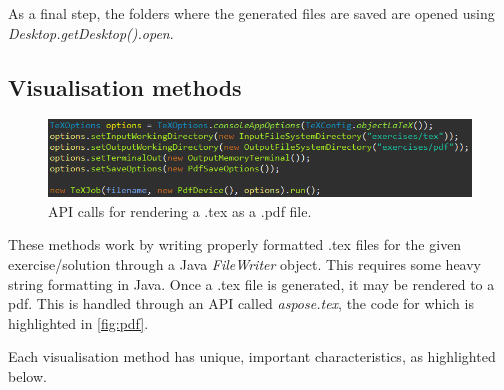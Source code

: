 \documentclass{l4proj}
\begin{document}
As a final step, the folders where the generated files are saved are opened using \emph{Desktop.getDesktop().open}.

\subsection{Visualisation methods}

\begin{figure}
    \centering
    \includegraphics[width=0.9\linewidth]{images/pdf.png}    

    \caption{API calls for rendering a .tex as a .pdf file.}
    \label{fig:pdf} 
\end{figure}

These methods work by writing properly formatted .tex files for the given exercise/solution through a Java \emph{FileWriter} object. This requires some heavy string formatting in Java. Once a .tex file is generated, it may be rendered to a pdf. This is handled through an API called \emph{aspose.tex}, the code for which is highlighted in \autoref{fig:pdf}.

Each visualisation method has unique, important characteristics, as highlighted below.
\end{document}
